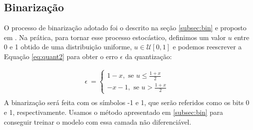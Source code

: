 \subsection{Binarização}

O processo de binarização adotado foi o descrito na seção \ref{subsec:bin} e proposto em \cite{Variable2016Toderici}.
Na prática, para tornar esse processo estocástico,  definimos um valor $u$ entre 0 e 1 obtido de uma distribuição uniforme,  $u \in \mathcal{U}[0,1]$ e podemos reescrever a Equação \ref{eq:quant2}  para obter o erro $\epsilon$ da quantização:

\begin{equation}
\label{eq:quant}
\begin{aligned}
\epsilon \ = \left\{
\begin{array}{ll}
1 - x, \text{ se $u$}  \leq \frac{1 + x}{2} \\
-x - 1, \text{ se $u$} > \frac{1 + x}{2}
\end{array}
\right. \\
\end{aligned}
\end{equation}
A binarização será feita com os símbolos -1 e 1, que serão referidos como os bits 0 e 1, respectivamente. Usamos o método apresentado em \ref{subsec:bin} para conseguir treinar o modelo com essa camada não diferenciável. 









